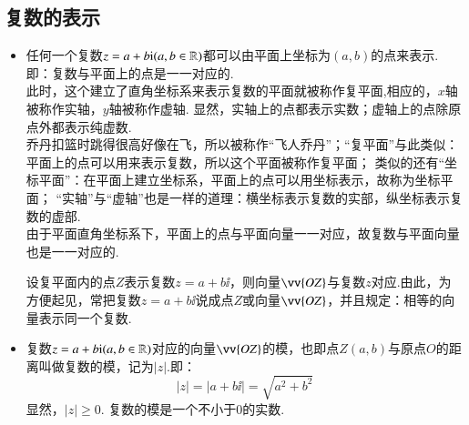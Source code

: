   \subsection{复数的表示}
    \begin{itemize}
      \item %
        任何一个复数$z=a+b{\mathrm i}(a,b\in\mathbb{R})$都可以由平面上坐标为$(a,b)$的点来表示.即：{\kaishu 复数与平面上的点是一一对应的}.\\
        此时，这个建立了直角坐标系来表示复数的平面就被称作{\fsong 复平面},相应的，$x$轴被称作{\fsong 实轴}，$y$轴被称作{\fsong 虚轴}.
        显然，{\kaishu 实轴上的点都表示实数；虚轴上的点除原点外都表示纯虚数}.\\
        {\kaishu 乔丹扣篮时跳得很高好像在飞，所以被称作“飞人乔丹”；“复平面”与此类似：平面上的点可以用来表示复数，所以这个平面被称作复平面；
         类似的还有“坐标平面”：在平面上建立坐标系，平面上的点可以用坐标表示，故称为坐标平面；
         “实轴”与“虚轴”也是一样的道理：横坐标表示复数的实部，纵坐标表示复数的虚部.}\\
        由于平面直角坐标系下，平面上的点与平面向量一一对应，故复数与平面向量也是一一对应的.\\
        \begin{center}\vspace{-2em}\vspace{-1.5em}
        \end{center}
        设复平面内的点$Z$表示复数$z=a+b\ii$，则向量$\vv{OZ}$与复数$z$对应.由此，为方便起见，常把复数$z=a+b\ii$说成点$Z$或向量$\vv{OZ}$，并且规定：相等的向量表示同一个复数.
        \\ 
      \item 复数$z=a+b{\mathrm i}(a,b\in\mathbb{R})$对应的向量$\vv{OZ}$的模，也即点$Z(a,b)$与原点$O$的距离叫做复数的模，记为$|z|$.即：
        \[|z|=|a+b\ii|=\sqrt{a^2+b^2}\]
        显然，$|z|\geqslant0$.
        {\kaishu 复数的模是一个不小于0的实数.}
        \\
    \end{itemize}
